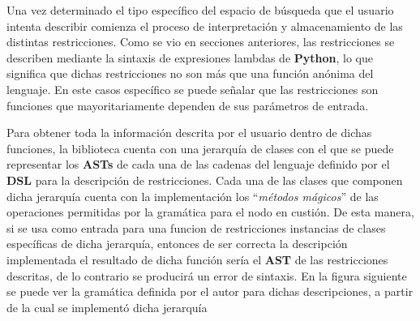 Una vez determinado el tipo específico del espacio de búsqueda que el usuario intenta describir comienza
el proceso de interpretación y almacenamiento de las distintas restricciones. Como se vio en secciones
anteriores, las restricciones se describen mediante la sintaxis de expresiones lambdas de {\bf Python}, lo que
significa que dichas restricciones no son más que una función anónima del lenguaje. En este casos específico
se puede señalar que las restricciones son funciones que mayoritariamente dependen de sus parámetros de entrada.

Para obtener toda la información descrita por el usuario dentro de dichas funciones, la biblioteca cuenta con
una jerarquía de clases con el que se puede representar los {\bf ASTs} de cada una de las cadenas del lenguaje definido
por el {\bf DSL} para la descripción de restricciones. Cada una de las clases que componen dicha jerarquía cuenta con
la implementación los ``{\it métodos mágicos}'' de las operaciones permitidas por la gramática para el nodo en custión. De esta manera,
si se usa como entrada para una funcion de restricciones instancias de clases específicas de dicha jerarquía,
entonces de ser correcta la descripción implementada el resultado de dicha función sería el {\bf AST} de las restricciones
descritas, de lo contrario se producirá un error de sintaxis. En la figura siguiente se puede ver la gramática definida por
el autor para dichas descripciones, a partir de la cual se implementó dicha jerarquía



